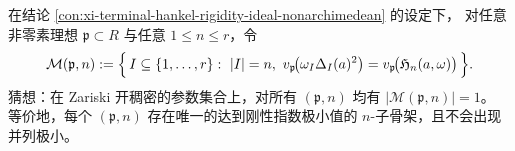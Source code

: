 \begin{conjecture}\label{conj:xi-nonarchimedean-minimizer-skeleton-uniqueness}
在结论 \ref{con:xi-terminal-hankel-rigidity-ideal-nonarchimedean} 的设定下，
对任意非零素理想 \(\mathfrak p\subset R\) 与任意 \(1\le n\le r\)，令
\[
\mathcal M(\mathfrak p,n)
:=\Bigl\{\,I\subseteq\{1,\dots,r\}:\ |I|=n,\ v_{\mathfrak p}\!\bigl(\omega_I\Delta_I(a)^2\bigr)=v_{\mathfrak p}\!\bigl(\mathfrak H_n(a,\omega)\bigr)\,\Bigr\}.
\]
猜想：在 Zariski 开稠密的参数集合上，对所有 \((\mathfrak p,n)\) 均有 \(\bigl|\mathcal M(\mathfrak p,n)\bigr|=1\)。
等价地，每个 \((\mathfrak p,n)\) 存在唯一的达到刚性指数极小值的 \(n\)-子骨架，且不会出现并列极小。
\end{conjecture}

